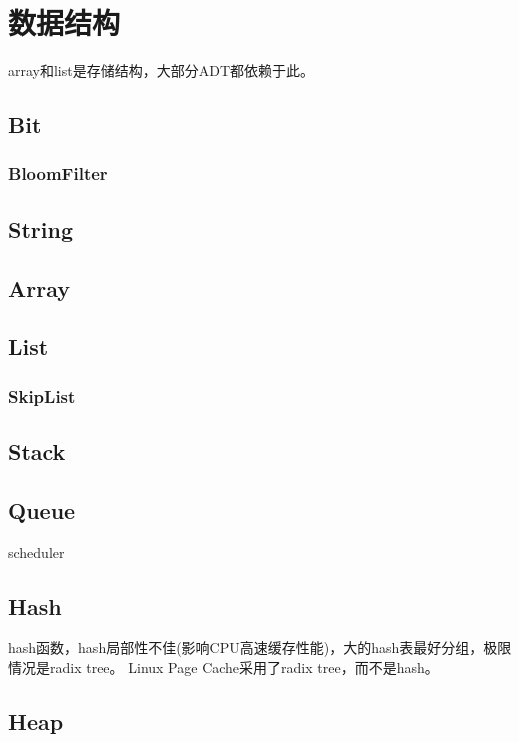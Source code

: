 \chapter{数据结构}

array和list是存储结构，大部分ADT都依赖于此。

\section{Bit}

\subsection{BloomFilter}

\section{String}

\section{Array}

\section{List}

\subsection{SkipList}

\section{Stack}

\section{Queue}

scheduler

\section{Hash}

hash函数，hash局部性不佳(影响CPU高速缓存性能)，大的hash表最好分组，极限情况是radix tree。
Linux Page Cache采用了radix tree，而不是hash。

\section{Heap}

